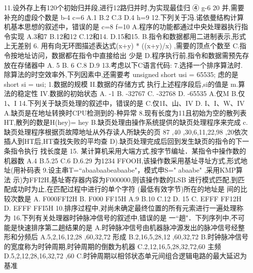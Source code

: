 11.设外存上有120个初始归并段,进行12路归并时,为实现最佳归
④
g-6
20
并,需要补充的虚段个数是
b-4
c=6
A.1
B.2
C.3
D.4
h=9
12.下列关于冯.诺依曼结构计算机基本思想的叙述中，错误的是
c=8
f=10
A.程序的功能都通过中央处理器执行指令实现
A.3和7
B.12和12
C.12和14.
D.15和15.
B.指令和数据都用二进制表示,形式上无差别
6. 用有向无环图描述表达式(x+y) * ((x+y)/x) ,需要的顶点个数至
C.指令按地址访问，数据都在指令中直接给出
少是
D.程序执行前,指令和数据需预先存放在存储器中
A. 5
B. 6
C.8
D.9
13.考虑以下C语言代码:
7.选择一个排序算法时.除算法的时空效率外,下列因素中,还需要考
unsigned short usi = 65535;
虑的是
short si = usi;
1.数据的规模
II.数据的存储方式
执行上述程序段后,si的值是
m.算法的稳定性
IV.数据的初始状态
A. -1
B. -32767
C. -32768
D. -65535
A.仅M
B.仅1、I
14.下列关于缺页处理的叙述中，错误的是
C.仅1I、山、IV
D. I、I、W、IV
A.缺页是在地址转换时CPU检测到的-种异常
8.现有长度为11且初始为空的散列表HT,散列的数是H(hey)= hey
B.缺页处理由操作系统提供的缺页处理程序来完成
c.缺页处理程序根据页故障地址从外存读人所缺失的页
87 ,40 ,30,6,11,22,98 ,20依次插人到HT后,HT查找失败的平均查
D).缺页处理完成后回到发生缺页的指令的下一条指令执行
找长度是
15. 某计算机采用大端方式,按字节编址．某指令中操作数的机器数
A.4
B.5.25
C.6
D.6.29
为1234 FFOOH,该操作数采用基址寻址方式,形式地址(用补码表
9.设主串T=“abaabaabeabaabe"，模式申S=" abaabe" ,采用KMP算法
示)为FFI2H,基址寄存器内容为F000000,则该操作数的LSB
进行模式匹配,到匹配成功时为止,在匹配过程中进行的单个字符
(最低有效字节)所在的地址是
间的比较次数是
A. F000FFI2H
B. F000 FF15H
A.9
B.10
C.12
D. 15
C. EFFF FF12H
D. EFFF FFI5H
10.排序过程中,对尚未确定最终位置的所有元索进行一遍处理称为
16.下列有关处理器时钟脉冲信号的叙述中,错误的是
一“趟"．下列序列中,不可能是快速排序第二趟结果的是
A.时钟脉冲信号由机器脉冲源发出的脉冲信号经整形和分频后
A.5,2,16,12,28 ,60,32,72
形成
B.2,16,5,28,12 ,60,32,72
B.时钟脉冲信号的宽度称为时钟周期,时钟周期的倒数为机器
C.2,12,16,5,28,32,72,60
主频
D.5,2,12,28,16,32,72 ,60
C.时钟周期以相邻状态单元间组合逻辑电路的最大延迟为基准
